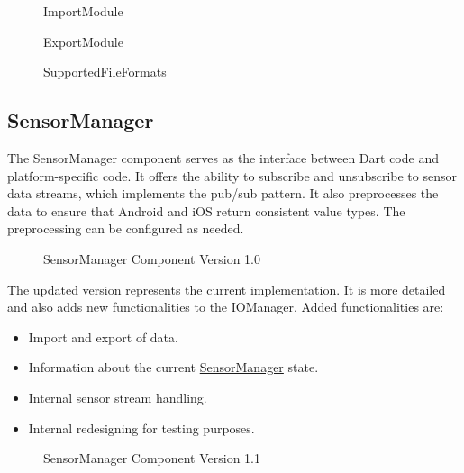 \documentclass[12pt]{article}
\begin{document}
\begin{figure}[ht]
\centering

\caption{\label{fig:bild16} ImportModule}
\end{figure}

\begin{figure}[ht]
\centering

\caption{\label{fig:bild17} ExportModule}
\end{figure}

\begin{figure}[ht]
\centering

\caption{\label{fig:bild18} SupportedFileFormats}
\end{figure}

\newpage
\null
\newpage

\subsection{SensorManager}
\label{sec:CSensorManager}
The SensorManager component serves as the interface between Dart code and platform-specific code. It offers the ability to subscribe and unsubscribe to sensor data streams, which implements the pub/sub pattern. It also preprocesses the data to ensure that Android and iOS return consistent value types. The preprocessing can be configured as needed.
\begin{figure}[ht]
\centering

\caption{\label{fig:bild19} SensorManager Component Version 1.0}
\end{figure}
\newpage

The updated version represents the current implementation. It is more detailed and also adds new functionalities to the IOManager. Added functionalities are:   
\begin{itemize}
  \item Import and export of data.
  \item Information about the current \hyperref[sec:SensorManager]{SensorManager} state.
  \item Internal sensor stream handling.
  \item Internal redesigning for testing purposes. 
\end{itemize}

\begin{figure}[ht]

\caption{\label{fig:bild20} SensorManager Component Version 1.1}
\end{figure}
\newpage
\end{document}
